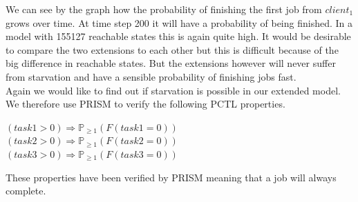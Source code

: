 \documentclass[12pt]{report}
\begin{document}
We can see by the graph how the probability of finishing the first job from $client_1$ grows over time. At time step 200 it will have a probability of being finished. In a model with 155127 reachable states this is again quite high. It would be desirable to compare the two extensions to each other but this is difficult because of the big difference in reachable states. But the extensions however will never suffer from starvation and have a sensible probability of finishing jobs fast.
\\Again we would like to find out if starvation is possible in our extended model. We therefore use PRISM to verify the following PCTL properties.
\begin{center}
$(task1 > 0) \Rightarrow \mathbb{P}_{\geq 1}(F(task1 = 0))$\\
$(task2 > 0) \Rightarrow \mathbb{P}_{\geq 1}(F(task2 = 0))$\\
$(task3 > 0) \Rightarrow \mathbb{P}_{\geq 1} (F(task3 = 0))$
\end{center}
These properties have been verified by PRISM meaning that a job will always complete.
\end{document}
